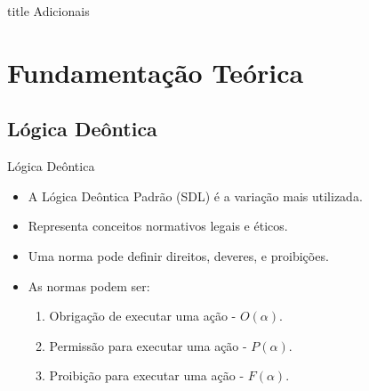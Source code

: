 
\begin{frame}
    \vfill
    \centering
    \begin{beamercolorbox}[sep=8pt,center,shadow=true,rounded=true]{title}
        Adicionais
    \end{beamercolorbox}
    \vfill
\end{frame}

\section{Fundamentação Teórica}

\subsection{Lógica Deôntica}
\begin{frame}{Lógica Deôntica}
    \begin{itemize}
        \item A Lógica Deôntica Padrão (SDL) é a variação mais utilizada.
        \item Representa conceitos normativos legais e éticos.
        \item Uma norma pode definir direitos, deveres, e proibições.
        \item As normas podem ser:
        \begin{enumerate}
            \item Obrigação de executar uma ação - $O(\alpha)$.
            \item Permissão para executar uma ação - $P(\alpha)$.
            \item Proibição para executar uma ação - $F(\alpha)$.
        \end{enumerate}
    \end{itemize}
\end{frame}

